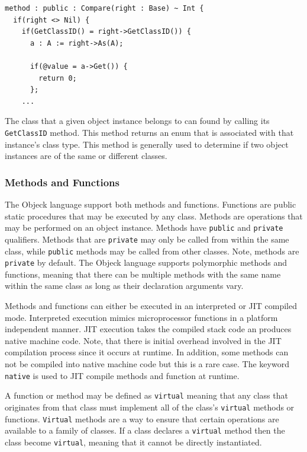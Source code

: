 \documentclass[12pt]{article}
\begin{document}
\begin{verbatim}
method : public : Compare(right : Base) ~ Int {
  if(right <> Nil) {
    if(GetClassID() = right->GetClassID()) {
      a : A := right->As(A);

      if(@value = a->Get()) {
        return 0;
      };
    ...	
\end{verbatim}

The class that a given object instance belongs to can found by calling its \texttt{GetClassID} method.  This method returns an enum that is associated with that instance's class type.  This method is generally used to determine if two object instances are of the same or different classes.

\subsubsection{Methods and Functions}
The Objeck language support both methods and functions.  Functions are public static procedures that may be executed by any class.  Methods are operations that may be performed on an object instance.  Methods have \texttt{public} and \texttt{private} qualifiers.  Methods that are \texttt{private} may only be called from within the same class, while \texttt{public} methods may be called from other classes.  Note, methods are \texttt{private} by default. The Objeck language supports polymorphic methods and functions, meaning that there can be multiple methods with the same name within the same class as long as their declaration arguments vary.

Methods and functions can either be executed in an interpreted or JIT compiled mode. Interpreted execution mimics microprocessor functions in a platform independent manner. JIT execution takes the compiled stack code an produces native machine code. Note, that there is initial overhead involved in the JIT compilation process since it occurs at runtime. In addition, some methods can not be compiled into native machine code but this is a rare case.  The keyword \texttt{native} is used to JIT compile methods and function at runtime.

A function or method may be defined as \texttt{virtual} meaning that any class that originates from that class must implement all of the class's \texttt{virtual} methods or functions.  \texttt{Virtual} methods are a way to ensure that certain operations are available to a family of classes. If a class declares a \texttt{virtual} method then the class become \texttt{virtual}, meaning that it cannot be directly instantiated.
\end{document}
